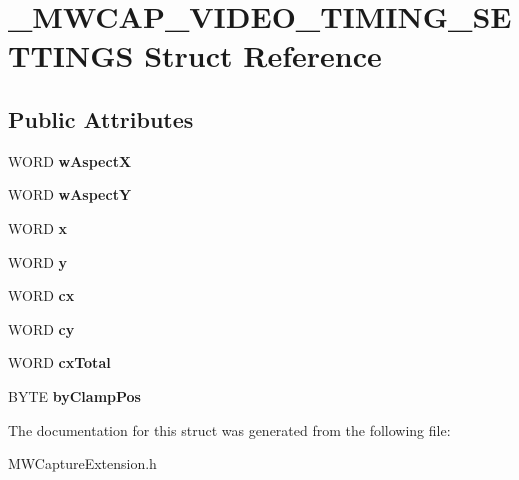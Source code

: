 \hypertarget{struct__MWCAP__VIDEO__TIMING__SETTINGS}{\section{\-\_\-\-M\-W\-C\-A\-P\-\_\-\-V\-I\-D\-E\-O\-\_\-\-T\-I\-M\-I\-N\-G\-\_\-\-S\-E\-T\-T\-I\-N\-G\-S Struct Reference}
\label{struct__MWCAP__VIDEO__TIMING__SETTINGS}
}
\subsection*{Public Attributes}
\begin{DoxyCompactItemize}
\item 
\hypertarget{struct__MWCAP__VIDEO__TIMING__SETTINGS_af046c70066d22438719e4936a4aaa2bf}{W\-O\-R\-D {\bfseries w\-Aspect\-X}}\label{struct__MWCAP__VIDEO__TIMING__SETTINGS_af046c70066d22438719e4936a4aaa2bf}

\item 
\hypertarget{struct__MWCAP__VIDEO__TIMING__SETTINGS_aadf75f00e27b0ac33348a2eda77cb045}{W\-O\-R\-D {\bfseries w\-Aspect\-Y}}\label{struct__MWCAP__VIDEO__TIMING__SETTINGS_aadf75f00e27b0ac33348a2eda77cb045}

\item 
\hypertarget{struct__MWCAP__VIDEO__TIMING__SETTINGS_a44c794c46bc59bc9fcb41848109dd757}{W\-O\-R\-D {\bfseries x}}\label{struct__MWCAP__VIDEO__TIMING__SETTINGS_a44c794c46bc59bc9fcb41848109dd757}

\item 
\hypertarget{struct__MWCAP__VIDEO__TIMING__SETTINGS_a0fc31756742770c58851547ae52b35d4}{W\-O\-R\-D {\bfseries y}}\label{struct__MWCAP__VIDEO__TIMING__SETTINGS_a0fc31756742770c58851547ae52b35d4}

\item 
\hypertarget{struct__MWCAP__VIDEO__TIMING__SETTINGS_adb4a37164773d7410f9454f6043d0b51}{W\-O\-R\-D {\bfseries cx}}\label{struct__MWCAP__VIDEO__TIMING__SETTINGS_adb4a37164773d7410f9454f6043d0b51}

\item 
\hypertarget{struct__MWCAP__VIDEO__TIMING__SETTINGS_a133766b1b19bb9a1bd2a0be74997dd83}{W\-O\-R\-D {\bfseries cy}}\label{struct__MWCAP__VIDEO__TIMING__SETTINGS_a133766b1b19bb9a1bd2a0be74997dd83}

\item 
\hypertarget{struct__MWCAP__VIDEO__TIMING__SETTINGS_a426705f4851091787e211a3c9a49c713}{W\-O\-R\-D {\bfseries cx\-Total}}\label{struct__MWCAP__VIDEO__TIMING__SETTINGS_a426705f4851091787e211a3c9a49c713}

\item 
\hypertarget{struct__MWCAP__VIDEO__TIMING__SETTINGS_abeda5af3dcafbc99b6a804bd9f9bb873}{B\-Y\-T\-E {\bfseries by\-Clamp\-Pos}}\label{struct__MWCAP__VIDEO__TIMING__SETTINGS_abeda5af3dcafbc99b6a804bd9f9bb873}

\end{DoxyCompactItemize}


The documentation for this struct was generated from the following file\-:\begin{DoxyCompactItemize}
\item 
M\-W\-Capture\-Extension.\-h\end{DoxyCompactItemize}
